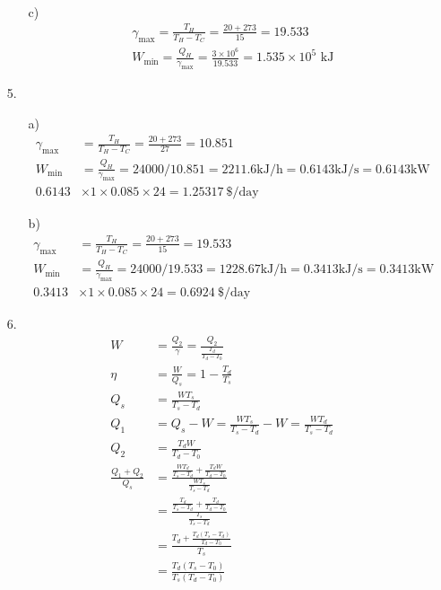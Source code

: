 \documentclass{article}
\begin{document}
\begin{itemize}
\begin{itemize}
\begin{align*}
        \end{align*}
        \item [c)]
        \begin{align*}
            \gamma_{\text{max}}=\frac{T_H}{T_H-T_C} = \frac{20+273}{15} = 19.533\\
            W_{\text{min}} = \frac{Q_H}{\gamma_{\text{max}}} = \frac{3\times 10^6}{19.533} = 1.535\times10^5\text{ kJ}
        \end{align*}
    \end{itemize}
    \item [5.]
    \begin{itemize}
        \item [a)]
        \begin{align*}
            \gamma_{\text{max}} &= \frac{T_H}{T_H-T_C} = \frac{20+273}{27} = 10.851 
            \\ W_{\text{min}} &= \frac{Q_H}{\gamma_{\text{max}}} = 24000/10.851 = 2211.6 \text{kJ/h} = 0.6143 \text{kJ/s} = 0.6143 \text{kW}\\
            0.6143 &\times 1 \times 0.085 \times 24 = 1.25317\ \$/\text{day}
        \end{align*}
        \item [b)]
        \begin{align*}
            \gamma_{\text{max}} &= \frac{T_H}{T_H-T_C} = \frac{20+273}{15} = 19.533 
            \\ W_{\text{min}} &= \frac{Q_H}{\gamma_{\text{max}}} = 24000/19.533 = 1228.67 \text{kJ/h} = 0.3413 \text{kJ/s} = 0.3413 \text{kW}\\
            0.3413 &\times 1 \times 0.085 \times 24 = 0.6924\ \$/\text{day}
        \end{align*}
    \end{itemize}
    \item [6.]
    \begin{align*}
        W &= \frac{Q_2}{\gamma} = \frac{Q_2}{\frac{T_d}{T_d-T_0}}\\
        \eta &= \frac{W}{Q_s}= 1-\frac{T_d}{T_s}\\
        Q_s &= \frac{WT_s}{T_s-T_d}\\
        Q_1 &= Q_s-W=\frac{WT_s}{T_s-T_d}-W=\frac{WT_d}{T_s-T_d}\\
        Q_2 &= \frac{T_dW}{T_d-T_0}\\
        \frac{Q_1+Q_2}{Q_s}&=\frac{\frac{WT_d}{T_s-T_d}+\frac{T_dW}{T_d-T_0}}{\frac{WT_s}{T_s-T_d}}\\
        &=\frac{\frac{T_d}{T_s-T_d}+\frac{T_d}{T_d-T_0}}{\frac{T_s}{T_s-T_d}}\\
        &=\frac{T_d+\frac{T_d(T_s-T_d)}{T_d-T_0}}{T_s}\\
        &=\frac{T_d(T_s-T_0)}{T_s(T_d-T_0)}
    \end{align*}
\end{itemize}
\end{document}
